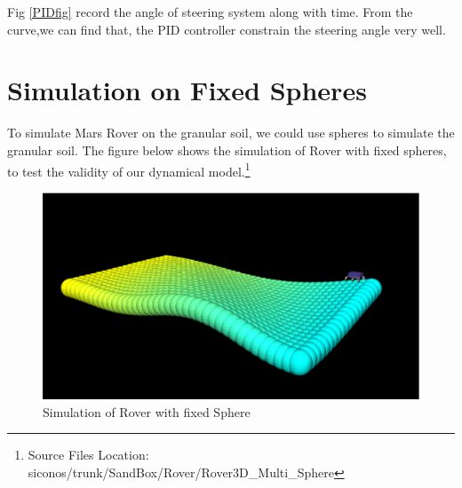 Fig \eqref{PIDfig} record the angle of steering system along with time. From the curve,we can find that, the PID controller constrain the steering angle very well.

\section{Simulation on Fixed Spheres}
To simulate Mars Rover on the granular soil, we could use spheres to simulate the granular soil. The figure below shows the simulation of Rover with fixed spheres, to test the validity of our dynamical model.\footnote{Source Files Location: siconos/trunk/SandBox/Rover/Rover3D\_Multi\_Sphere}


\begin{figure}[H]
 \begin{center}
      \includegraphics[width=5in]{Chapter5/RoverSpheres.eps}
    \caption{Simulation of Rover with fixed Sphere}
  \end{center}
\end{figure}




